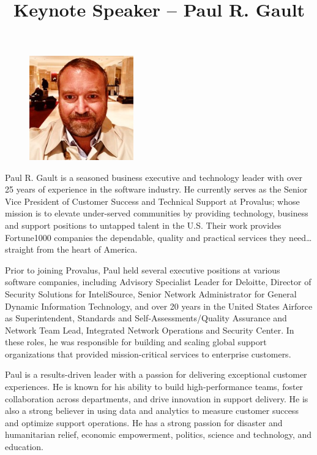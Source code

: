 \documentclass{article}
\title{Keynote Speaker -- Paul R. Gault}
\begin{document}
\maketitle



\begin{figure}
\vspace{-20pt}
\centering
  \includegraphics[width=0.4\textwidth]{keynote.jpg}
\end{figure}

Paul R. Gault is a seasoned business executive and technology leader with over 25 years of experience in the software industry. He currently serves as the Senior Vice President of Customer Success and Technical Support at Provalus; whose mission is to elevate under-served communities by providing technology, business and support positions to untapped talent in the U.S. Their work provides Fortune1000 companies the dependable, quality and practical services they need…straight from the heart of America.

Prior to joining Provalus, Paul held several executive positions at various software companies, including Advisory Specialist Leader for Deloitte, Director of Security Solutions for InteliSource, 
Senior Network Administrator for General Dynamic Information Technology, and over 20 years in the United States Airforce as Superintendent, Standards and Self-Assessments/Quality Assurance and Network Team Lead, Integrated Network Operations and Security Center.  In these roles, he was responsible for building and scaling global support organizations that provided mission-critical services to enterprise customers.

Paul is a results-driven leader with a passion for delivering exceptional customer experiences. He is known for his ability to build high-performance teams, foster collaboration across departments, and drive innovation in support delivery. He is also a strong believer in using data and analytics to measure customer success and optimize support operations. He has a strong passion for disaster and humanitarian relief, economic empowerment, politics, science and technology, and education.
\end{document}
